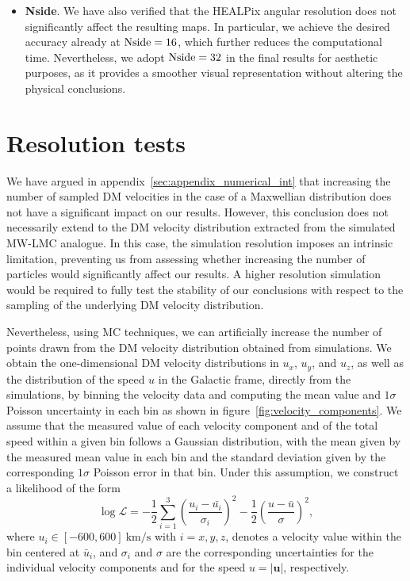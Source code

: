 \documentclass[a4paper,11pt]{article}
\begin{document}
\begin{itemize}
    \item \textbf{Nside}. We have also verified that the HEALPix angular resolution  does not significantly affect the resulting maps. In particular, we achieve the desired accuracy already at ${\rm Nside} = 16$, which further reduces the computational time. Nevertheless, we adopt ${\rm Nside} = 32$ in the final results for aesthetic purposes, as it provides a smoother visual representation without altering the physical conclusions.
\end{itemize}


\section{Resolution tests}
\label{sec:lmc_sampling}



We have argued in appendix~\ref{sec:appendix_numerical_int} that increasing the number of sampled DM velocities in the case of a Maxwellian distribution does not have a significant impact on our results. However, this conclusion does not necessarily extend to the DM velocity distribution extracted from the simulated MW-LMC analogue. In this case, the simulation resolution imposes an intrinsic limitation, preventing us from assessing whether increasing the number of particles would significantly affect our results. A higher resolution simulation would be required to fully test the stability of our conclusions with respect to the sampling of the underlying DM velocity distribution.

Nevertheless, using MC techniques, we can artificially increase the number of points drawn from the DM velocity distribution obtained from simulations. We obtain the one-dimensional DM velocity distributions in $u_x$, $u_y$, and $u_z$, as well as the distribution of the speed $u$ in the Galactic frame, directly from the simulations, by binning the velocity data and computing the mean value and $1\sigma$ Poisson uncertainty in each bin as shown in figure~\ref{fig:velocity_components}. We assume that the measured value of each velocity component and of the total speed within a given bin follows a Gaussian distribution, with the mean given by the measured mean value in each bin and the standard deviation given by the corresponding $1\sigma$ Poisson error in that bin. Under this assumption, we construct a likelihood of the form
%
\begin{equation}
\log\mathcal{L} = -\frac{1}{2}\sum_{i=1}^{3} \left( \frac{u_{i} - \bar{u_{i}}}{\sigma_{i}} \right)^{2} - \frac{1}{2}\left( \frac{u - \bar{u}}{\sigma}\right)^2,
\label{eq:like_lmc}
\end{equation}
where $u_i \in [-600,600]\ \mathrm{km/s}$ with $i=x,y,z$, denotes a velocity value within the bin centered at $\bar{u}_i$, and $\sigma_i$ and $\sigma$ are the corresponding uncertainties for the individual velocity components and for the speed $u=|\mathbf{u}|$, respectively.
\end{document}

